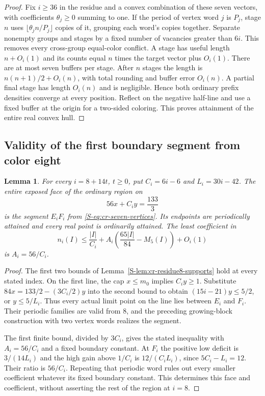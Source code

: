 \documentclass[11pt,reqno]{amsart}
\theoremstyle{plain}
\theoremstyle{plain}
\theoremstyle{plain}
\newtheorem{Slemma}[Stheorem]{Lemma}
\begin{document}
\begin{proof}
Fix $i\ge36$ in the residue and a convex combination of these
seven vectors, with coefficients $\theta_j\ge0$ summing to one.
If the period of vertex word $j$ is $P_j$, stage $n$ uses
$\lfloor\theta_j n/P_j\rfloor$ copies of it, grouping each word's
copies together. Separate nonempty groups and stages by a fixed
number of vacancies greater than $6i$. This removes every
cross-group equal-color conflict. A stage has useful length
$n+O_i(1)$ and its counts equal $n$ times the target vector
plus $O_i(1)$. There are at most seven buffers per stage.
After $n$ stages the length is $n(n+1)/2+O_i(n)$, with total
rounding and buffer error $O_i(n)$. A partial final stage has
length $O_i(n)$ and is negligible. Hence both ordinary prefix
densities converge at every position. Reflect on the negative
half-line and use a fixed buffer at the origin for a two-sided
coloring. This proves attainment of the entire real convex hull.
\end{proof}

\subsection{Validity of the first boundary segment from color eight}
\label{S-supp:cr-first-face}

\begin{Slemma}\label{S-lem:cr-first-face}
For every $i=8+14t$, $t\ge0$, put $C_i=6i-6$ and $L_i=30i-42$.
The entire exposed face of the ordinary region on
\[
 56x+C_i y=\frac{133}{3}
\]
is the segment $E_iF_i$ from \eqref{S-eq:cr-seven-vertices}. Its
endpoints are periodically attained and every real point is
ordinarily attained. The least coefficient in
\[
 n_i(I)\le\frac{|I|}{C_i}
       +A_i\left(\frac{65|I|}{84}-M_5(I)\right)+O_i(1)
\]
is $A_i=56/C_i$.
\end{Slemma}
\begin{proof}
The first two bounds of Lemma~\ref{S-lem:cr-residue8-supports}
hold at every stated index. On the first line, the cap
$x\le m_0$ implies $C_i y\ge1$. Substitute
$84x=133/2-(3C_i/2)y$ into the second bound to obtain
$(15i-21)y\le5/2$, or $y\le5/L_i$. Thus every actual limit
point on the line lies between $E_i$ and $F_i$. Their periodic
families are valid from $8$, and the preceding growing-block
construction with two vertex words realizes the segment.

The first finite bound, divided by $3C_i$, gives the stated
inequality with $A_i=56/C_i$ and a fixed boundary constant.
At $F_i$ the positive low deficit is $3/(14L_i)$ and the
high gain above $1/C_i$ is $12/(C_iL_i)$, since $5C_i-L_i=12$.
Their ratio is $56/C_i$. Repeating that periodic word rules
out every smaller coefficient whatever its fixed boundary
constant. This determines this face and coefficient, without
asserting the rest of the region at $i=8$.
\end{proof}
\end{document}
